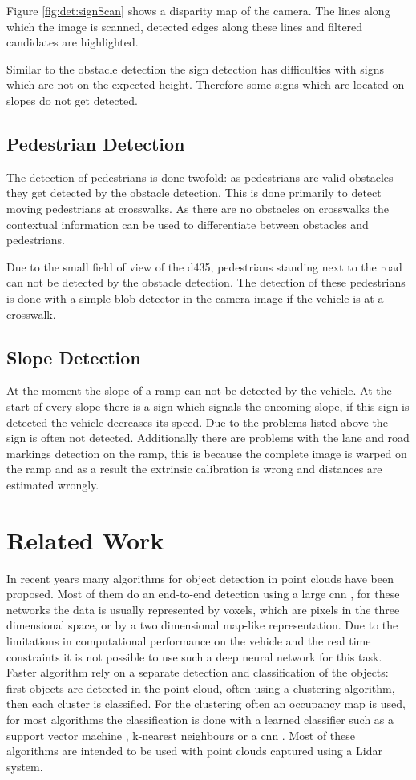 Figure \ref{fig:det:signScan} shows a disparity map of the camera. The lines along which the image is scanned, detected edges along these lines and filtered candidates are highlighted.

Similar to the obstacle detection the sign detection has difficulties with signs which are not on the expected height. Therefore some signs which are located on slopes do not get detected.

\subsection{Pedestrian Detection}
The detection of pedestrians is done twofold: as pedestrians are valid obstacles they get detected by the obstacle detection. 
This is done primarily to detect moving pedestrians at crosswalks. 
As there are no obstacles on crosswalks the contextual information can be used to differentiate between obstacles and pedestrians. 

Due to the small field of view of the \ac{d435}, pedestrians standing next to the road can not be detected by the obstacle detection. 
The detection of these pedestrians is done with a simple blob detector in the camera image if the vehicle is at a crosswalk.

\subsection{Slope Detection}
At the moment the slope of a ramp can not be detected by the vehicle. 
At the start of every slope there is a sign which signals the oncoming slope, if this sign is detected the vehicle decreases its speed.
Due to the problems listed above the sign is often not detected. Additionally there are problems with the lane and road markings detection on the ramp, this is because the complete image is warped on the ramp and as a result the extrinsic calibration is wrong and distances are estimated wrongly.

\section{Related Work}
In recent years many algorithms for object detection in point clouds have been proposed. 
Most of them do an end-to-end detection using a large \ac{cnn} \cite{Yin17} \cite{Bin19} \cite{Mar18} \cite{Li16}, for these networks the data is usually represented by voxels, which are pixels in the three dimensional space, or by a two dimensional map-like representation.
Due to the limitations in computational performance on the vehicle and the real time constraints it is not possible to use such a deep neural network for this task.
Faster algorithm rely on a separate detection and classification of the objects: first objects are detected in the point cloud, often using a clustering algorithm, then each cluster is classified.
For the clustering often an occupancy map is used, for most algorithms the classification is done with a learned classifier such as a support vector machine \cite{HivHWu10}, k-nearest neighbours \cite{YifeiTian18} or a \ac{cnn} \cite{AttBen17}.
Most of these algorithms are intended to be used with point clouds captured using a Lidar system.

